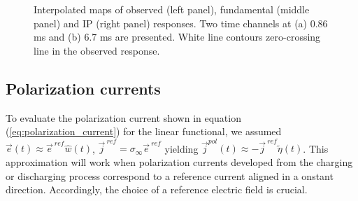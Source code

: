 \documentclass[extra,mreferee]{gji}
\newcommand{\siginf}{\sigma_\infty}
\renewcommand {\j}  { {\vec j} }
\newcommand {\e}  { {\vec e} }
\newcommand{\peta}{\tilde{\eta}}
\newcommand{\eref}{\e^{\ ref}}
\begin{document}
\begin{figure}
  \caption{Interpolated maps of observed (left panel), fundamental (middle panel) and IP (right panel) responses. Two time channels at (a) 0.86 ms and (b) 6.7 ms are presented. White line contours zero-crossing line in the observed response.  
  }
  \label{F:IPresp_Plan}
\end{figure}
\clearpage

\subsection{Polarization currents}
To evaluate the polarization current shown in equation (\ref{eq:polarization_current}) for the linear functional, we assumed $\e(t) \approx \eref \hat{w}(t)$, $\j^{\ ref}=\siginf \eref$ yielding $\j^{pol}(t) \approx -\j^{\ ref} \peta(t)$. This approximation will work when polarization currents developed from the charging or discharging process correspond to a reference current aligned in a onstant direction. Accordingly, the choice of a reference electric field is crucial. 

\end{document}
